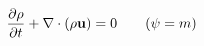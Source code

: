 \documentclass[preview]{standalone}
\begin{document}
\begin{align*}
\special{dvisvgm:raw <g id='unique000'>}\pdv{\rho}{t}+\nabla\cdot(\rho\va u)=0\qquad(\psi=m)\special{dvisvgm:raw </g>}
\end{align*}
\end{document}

